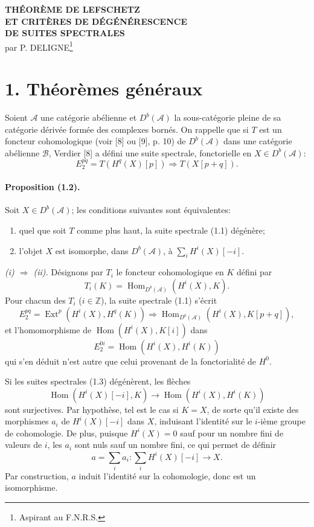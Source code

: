 \documentclass[10pt]{article}
\newcommand{\Acal}{\mathcal A}
\newcommand{\Bcal}{\mathcal B}
\newcommand{\Z}{\mathbb Z}
\newcommand{\Db}{D^b}
\newcommand{\Hom}{\operatorname{Hom}}
\newcommand{\Ext}{\operatorname{Ext}}
\begin{document}
\begin{center}
{\Large\bfseries THÉORÈME DE LEFSCHETZ\\
ET CRITÈRES DE DÉGÉNÉRESCENCE\\
DE SUITES SPECTRALES}\\[0.6em]
par P. DELIGNE\footnote{Aspirant au F.N.R.S.}
\end{center}

\section*{1. Théorèmes généraux}

Soient $\Acal$ une catégorie abélienne et $\Db(\Acal)$ la sous-catégorie pleine de sa catégorie dérivée formée des complexes bornés. On rappelle que si $T$ est un foncteur cohomologique (voir [8] ou [9], p. 10) de $\Db(\Acal)$ dans une catégorie abélienne $\Bcal$, Verdier [8] a défini une suite spectrale, fonctorielle en $X\in\Db(\Acal)$:
\[
\tag{1.1}
E_2^{pq}=T(H^q(X)[p])\Longrightarrow T(X[p+q]).
\]

\paragraph{Proposition (1.2).} Soit $X\in\Db(\Acal)$; les conditions suivantes sont équivalentes:
\begin{enumerate}[label=(\roman*)]
\item quel que soit $T$ comme plus haut, la suite spectrale (1.1) dégénère;
\item l'objet $X$ est isomorphe, dans $\Db(\Acal)$, à $\sum_i H^i(X)[-i]$.
\end{enumerate}

\emph{(i) $\Rightarrow$ (ii).} Désignons par $T_i$ le foncteur cohomologique en $K$ défini par
\[
T_i(K)=\Hom_{\Db(\Acal)}(H^i(X),K).
\]
Pour chacun des $T_i$ ($i\in\Z$), la suite spectrale (1.1) s'écrit
\[
\tag{1.3}
E_2^{pq}=\Ext^p(H^i(X),H^q(K))\Longrightarrow
\Hom_{\Db(\Acal)}(H^i(X),K[p+q]),
\]
et l'homomorphisme de $\Hom(H^i(X),K[i])$ dans
\[
E_2^{0i}=\Hom(H^i(X),H^i(K))
\]
qui s'en déduit n'est autre que celui provenant de la fonctorialité de $H^0$.

Si les suites spectrales (1.3) dégénèrent, les flèches
\[
\Hom(H^i(X)[-i],K)\longrightarrow \Hom(H^i(X),H^i(K))
\]
sont surjectives. Par hypothèse, tel est le cas si $K=X$, de sorte qu'il existe des morphismes $a_i$ de $H^i(X)[-i]$ dans $X$, induisant l'identité sur le $i$-ième groupe de cohomologie. De plus, puisque $H^i(X)=0$ sauf pour un nombre fini de valeurs de $i$, les $a_i$ sont nuls sauf un nombre fini, ce qui permet de définir
\[
a=\sum_i a_i:\sum_i H^i(X)[-i]\longrightarrow X.
\]
Par construction, $a$ induit l'identité sur la cohomologie, donc est un isomorphisme.
\end{document}
